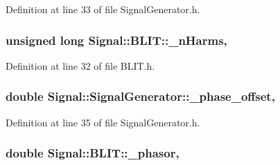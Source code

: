 Definition at line 33 of file Signal\+Generator.\+h.

\hypertarget{class_signal_1_1_b_l_i_t_a9ec3a46bd37f7d76a8924dd7dd3622bd}{
\subsubsection[{\+\_\+n\+Harms}]{\setlength{\rightskip}{0pt plus 5cm}unsigned long Signal\+::\+B\+L\+I\+T\+::\+\_\+n\+Harms\hspace{0.3cm}{\ttfamily [protected]}, {\ttfamily [inherited]}}}\label{class_signal_1_1_b_l_i_t_a9ec3a46bd37f7d76a8924dd7dd3622bd}


Definition at line 32 of file B\+L\+I\+T.\+h.

\hypertarget{class_signal_1_1_signal_generator_a6b4444d46747c8517171edbbf4b5588f}{
\subsubsection[{\+\_\+phase\+\_\+offset}]{\setlength{\rightskip}{0pt plus 5cm}double Signal\+::\+Signal\+Generator\+::\+\_\+phase\+\_\+offset\hspace{0.3cm}{\ttfamily [protected]}, {\ttfamily [inherited]}}}\label{class_signal_1_1_signal_generator_a6b4444d46747c8517171edbbf4b5588f}


Definition at line 35 of file Signal\+Generator.\+h.

\hypertarget{class_signal_1_1_b_l_i_t_ae5ca010acf48cd0df232462cfaf95a3a}{
\subsubsection[{\+\_\+phasor}]{\setlength{\rightskip}{0pt plus 5cm}double Signal\+::\+B\+L\+I\+T\+::\+\_\+phasor\hspace{0.3cm}{\ttfamily [protected]}, {\ttfamily [inherited]}}}\label{class_signal_1_1_b_l_i_t_ae5ca010acf48cd0df232462cfaf95a3a}


